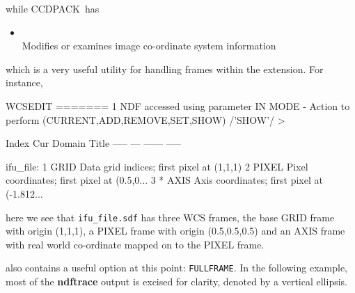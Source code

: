 \documentclass[twoside,11pt]{starlink}
\providecommand{\CCDPACK}{{\footnotesize CCDPACK}\normalsize}
\begin{document}
while \CCDPACK\ has

\begin{itemize}
\item{}\\
Modifies or examines image co-ordinate system information
\end{itemize}

which is a very useful utility for handling frames within the extension.
For instance,

\begin{small}
\begin{terminalv}

   WCSEDIT
   =======
 1 NDF accessed using parameter IN
MODE - Action to perform (CURRENT,ADD,REMOVE,SET,SHOW) /'SHOW'/ >

   Index Cur  Domain            Title
   ----- ---  ------            -----

ifu_file:
     1        GRID              Data grid indices; first pixel at (1,1,1)
     2        PIXEL             Pixel coordinates; first pixel at (0.5,0...
     3    *   AXIS              Axis coordinates; first pixel at (-1.812...

%
\end{terminalv}
\end{small}

here we see that \texttt{ifu\_file.sdf} has three WCS frames, the base
GRID frame with origin (1,1,1), a PIXEL frame with origin
(0.5,0.5,0.5) and an AXIS frame with real world co-ordinate mapped
on to the PIXEL frame.

 also contains a useful option at this
point: \texttt{FULLFRAME}.  In the following example, most of the \textbf{ndftrace}
output is excised for clarity, denoted by a vertical ellipsis.
\end{document}
